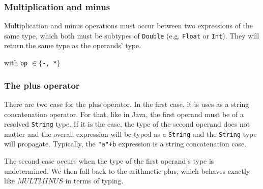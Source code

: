 \documentclass[11pt]{article}
\begin{document}
\begin{center}
 
\DP
\end{center}

\subsubsection{Multiplication and minus}

Multiplication and minus operations must occur between two expressions of the same type, which both must be subtypes of \texttt{Double} (e.g. \texttt{Float} or \texttt{Int}). They will return the same type as the operands' type.

\begin{center}
 
\DP
\end{center}
\begin{center}with  \texttt{op} $\in \{$\texttt{-, *}$\}$\end{center}


\subsubsection{The plus operator}

There are two case for the plus operator. In the first case, it is uses as a string concatenation operator. For that, like in Java, the first operand must be of a resolved \texttt{String} type. If it is the case, the type of the second operand does not matter and the overall expression will be typed as a \texttt{String} and the \texttt{String} type will propagate. Typically, the \texttt{"a"+b} expression is a string concatenation case.

\begin{center}
 
\DP
\end{center}

The second case occurs when the type of the first operand's type is undetermined. We then fall back to the arithmetic plus, which behaves exactly like $MULTMINUS$ in terms of typing.

\begin{center}
 
\DP
\end{center}
\end{document}
